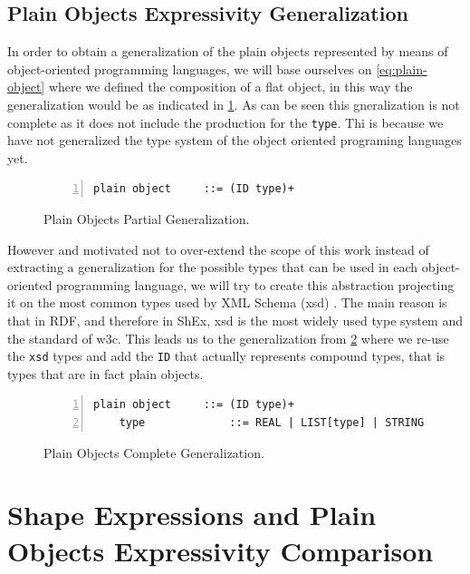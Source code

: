 \subsection{Plain Objects Expressivity Generalization}
In order to obtain a generalization of the plain objects represented by means of object-oriented programming languages,
we will base ourselves on \cref{eq:plain-object} where we defined the composition of a flat object, in this way the
generalization would be as indicated in \cref{fig:po-generalization}. As can be seen this gneralization is not complete
as it does not include the production for the \texttt{type}. Thi is because we have not generalized the type system of the
object oriented programing languages yet.

\begin{figure}
    \begin{lstlisting}[numbers=left,basicstyle=\ttfamily\small]
    plain object     ::= (ID type)+
    \end{lstlisting}
    \caption[Plain Objects Partial Generalization]{Plain Objects Partial Generalization.}
    \label{fig:po-generalization}
\end{figure}

However and motivated not to over-extend the scope of this work instead of extracting a generalization for the possible types
that can be used in each object-oriented programming language, we will try to create this abstraction projecting it on the
most common types used by XML Schema (xsd) \cite{xmlschemasimpleelements}. The main reason is that in RDF, and therefore in ShEx, xsd is the most widely
used type system and the standard of w3c. This leads us to the generalization from \cref{fig:po-generalization-complete} where we re-use the
\texttt{xsd} types and add the \texttt{ID} that actually represents compound types, that is types that are in fact plain objects.

\begin{figure}
    \begin{lstlisting}[numbers=left,basicstyle=\ttfamily\small]
    plain object     ::= (ID type)+
    type             ::= REAL | LIST[type] | STRING | BOOLEAN | ID
    \end{lstlisting}
    \caption[Plain Objects Complete Generalization]{Plain Objects Complete Generalization.}
    \label{fig:po-generalization-complete}
\end{figure}


\section{Shape Expressions and Plain Objects Expressivity Comparison}

